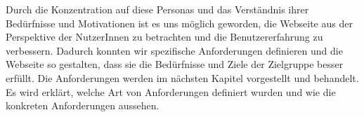 
Durch die Konzentration auf diese Personas und das Verständnis ihrer Bedürfnisse und Motivationen ist es uns möglich geworden, die Webseite aus der Perspektive der NutzerInnen zu betrachten und die Benutzererfahrung zu verbessern. Dadurch konnten wir spezifische Anforderungen definieren und die Webseite so gestalten, dass sie die Bedürfnisse und Ziele der Zielgruppe besser erfüllt.
Die Anforderungen werden im nächsten Kapitel vorgestellt und behandelt.
Es wird erklärt, welche Art von Anforderungen definiert wurden und wie die konkreten Anforderungen aussehen.
